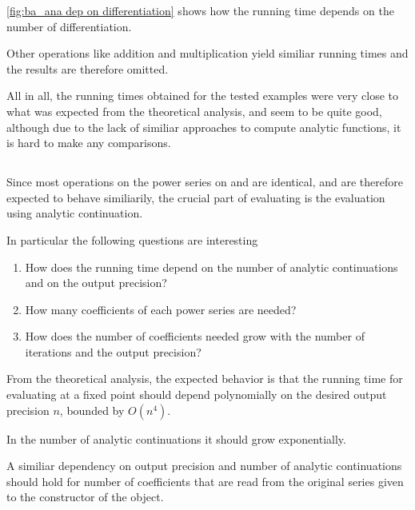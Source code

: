       \ref{fig:ba_ana dep on differentiation} shows how the running time depends on the number of differentiation. 

      Other operations like addition and multiplication yield similiar running times and the results are therefore omitted.

      All in all, the running times obtained for the tested examples were very close to what was expected from the theoretical analysis, and seem to
      be quite good, although due to the lack of similiar approaches to compute analytic functions, it is hard to make any comparisons.

      \subsection{\anarect}
			Since most operations on the power series on \anarect and \baana are identical‚ and are therefore expected to behave similiarily, 
			the crucial part of evaluating \baana is the evaluation using analytic continuation.
			
			In particular the following questions are interesting
			\begin{enumerate}
				\item How does the running time depend on the number of analytic continuations and on the output precision?
				\item How many coefficients of each power series are needed?
				\item How does the number of coefficients needed grow with the number of iterations and the output precision?
			\end{enumerate} 

		From the theoretical analysis, the expected behavior is that the running time for evaluating at a fixed 
		point should depend polynomially on the desired output precision $n$, bounded by $O(n^4)$.

    In the number of analytic continuations it should grow exponentially.
    
    A similiar dependency on output precision and number of analytic continuations should hold for number of coefficients that are read 
    from the original series given to the constructor of the \anarect object.


